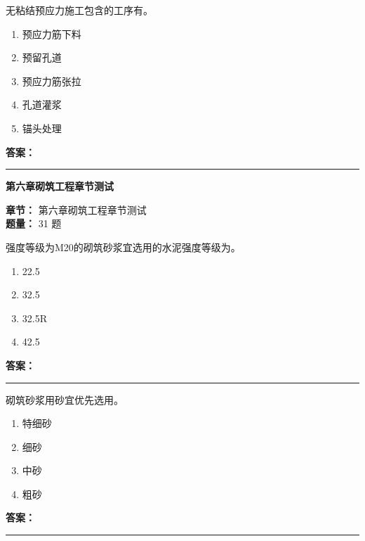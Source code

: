 \documentclass[UTF8,fontset=fandol,11pt]{ctexart}
\newcommand{\chaptertitle}[1]{\vspace{0.5em}\begin{tcolorbox}[enhanced,colback=deepblue,colframe=deepblue,arc=2mm,boxrule=0pt]\begin{center}\Large\bfseries\color{white}#1\end{center}\end{tcolorbox}\vspace{0.5em}}
\newcommand{\answerline}{\textcolor{answerred}{\rule{2.4cm}{0.7pt}}}
\begin{document}
\vspace{0.2em}

\begin{quizbox}[title={第 7 题}]
无粘结预应力施工包含的工序有。\\
\begin{enumerate}[label=\Alph*.]
\item 预应力筋下料
\item 预留孔道
\item 预应力筋张拉
\item 孔道灌浆
\item 锚头处理
\end{enumerate}
\textbf{\textcolor{answerred}{答案：}} \answerline
\end{quizbox}

\vspace{0.2em}

\chaptertitle{第六章砌筑工程章节测试}
\begin{mainbox}
\textbf{\textcolor{mainblue}{章节：}} 第六章砌筑工程章节测试\\
\textbf{\textcolor{answerred}{题量：}} 31 题
\end{mainbox}

\begin{quizbox}[title={第 1 题}]
强度等级为M20的砌筑砂浆宜选用的水泥强度等级为。\\
\begin{enumerate}[label=\Alph*.]
\item 22.5
\item 32.5
\item 32.5R
\item 42.5
\end{enumerate}
\textbf{\textcolor{answerred}{答案：}} \answerline
\end{quizbox}

\vspace{0.2em}

\begin{quizbox}[title={第 2 题}]
砌筑砂浆用砂宜优先选用。\\
\begin{enumerate}[label=\Alph*.]
\item 特细砂
\item 细砂
\item 中砂
\item 粗砂
\end{enumerate}
\textbf{\textcolor{answerred}{答案：}} \answerline
\end{quizbox}

\vspace{0.2em}
\end{document}
